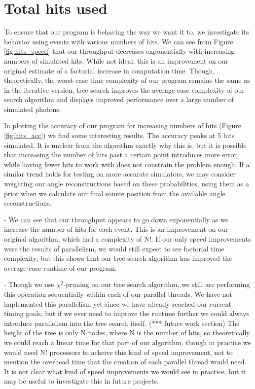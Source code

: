 \section{Total hits used}
To ensure that our program is behaving the way we want it to, we investigate its behavior using events with various numbers of hits. We can see from Figure \ref{fig:hits_speed} that our throughput decreases exponentially with increasing numbers of simulated hits. While not ideal, this is an improvement on our original estimate of a factorial increase in computation time. Though, theoretically, the worst-case time complexity of our program remains the same as in the iterative version, tree search improves the average-case complexity of our search algorithm and displays improved performance over a large number of simulated photons.

In plotting the accuracy of our program for increasing numbers of hits (Figure \ref{fig:hits_acc}) we find some interesting results. The accuracy peaks at 5 hits simulated. It is unclear from the algorithm exactly why this is, but it is possible that increasing the number of hits past a certain point introduces more error, while having fewer hits to work with does not constrain the problem enough. If a similar trend holds for testing on more accurate simulators, we may consider weighting our angle reconstructions based on these probabilities, using them as a prior when we calculate our final source position from the available angle reconstructions.

- We can see that our throughput appears to go down exponentially as we increase the number of hits for each event. This is an improvement on our original algorithm, which had a complexity of N!. If our only speed improvements were the results of parallelism, we would still expect to see factorial time complexity, but this shows that our tree search algorithm has improved the average-case runtime of our program.

- Though we use $\chi^2$-pruning on our tree search algorithm, we still are performing this operation sequentially within each of our parallel threads. We have not implemented this parallelism yet since we have already reached our current timing goals, but if we ever need to improve the runtime further we could always introduce parallelism into the tree search itself. (*** future work section) The height of the tree is only N nodes, where N is the number of hits, so theoretically we could reach a linear time for that part of our algorithm, though in practice we would need N! processors to acheive this kind of speed improvement, not to mention the overhead time that the creation of each parallel thread would need. It is not clear what kind of speed improvements we would see in practice, but it may be useful to investigate this in future projects.

